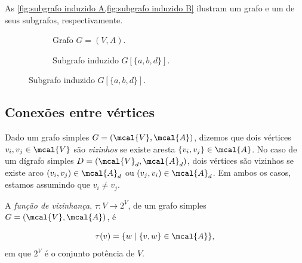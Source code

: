 As \cref{fig:subgrafo induzido A,fig:subgrafo induzido B} ilustram um grafo e um de seus subgrafos, respectivamente.

\begin{figure}
\centering
\begin{subfigure}{.5\textwidth}
  \centering
  \caption{Grafo $G = (V, A)$.}\label{fig:subgrafo induzido A}
\end{subfigure}%
\begin{subfigure}{.5\textwidth}
  \centering
  \caption{Subgrafo induzido $G[\{a, b, d\}]$.}\label{fig:subgrafo induzido B}
\end{subfigure}
\label{fig:subgrafo induzido por vértice}
\end{figure}

\subsection{Conexões entre vértices}
\begin{mydef}
    Dado um grafo simples $G = (\mcal{V}, \mcal{A})$, dizemos que dois vértices $v_i,v_j \in \mcal{V}$ são \emph{vizinhos} se existe aresta $\{v_i,v_j\} \in \mcal{A}$. No caso de um dígrafo simples $D = (\mcal{V}_d, \mcal{A}_d)$, dois vértices são vizinhos se existe arco $(v_i,v_j) \in \mcal{A}_d$ ou $(v_j,v_i) \in \mcal{A}_d$. Em ambos os casos, estamos assumindo que $v_i \neq v_j$.
\end{mydef}

A \emph{função de vizinhança}, $\tau : V \rightarrow 2^V$, de um grafo simples $G = (\mcal{V}, \mcal{A})$, é

\begin{equation}
    \tau(v) = \{w \mid \{v, w\} \in \mcal{A}\},
\end{equation}
em que $2^V$ é o conjunto potência de $V$.

